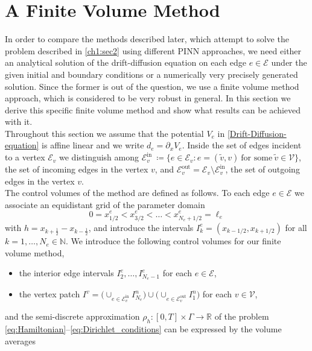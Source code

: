 \chapter{A Finite Volume Method}
\label{ch2}

In order to compare the methods described later, which attempt to solve the problem described in \cref{ch1:sec2} using different PINN approaches, we need either an analytical solution of the drift-diffusion equation on each edge $e \in \mathcal{E}$ under the given initial and boundary conditions or a numerically very precisely generated solution. Since the former is out of the question, we use a finite volume method approach, which is considered to be very robust in general. In this section we derive this specific finite volume method and show what results can be achieved with it.  \\
Throughout this section we assume that the potential $V_e$ in \cref{Drift-Diffusion-equation} is affine linear and we write $d_e = \partial_x V_e$. Inside the set of edges incident to a vertex $\mathcal{E}_v$ we distinguish among $\mathcal{E}_v^{\text{in}} \ \coloneqq \{ e \in \mathcal{E}_v \colon e = ( \widetilde{v}, v ) \ \text{for some} \ \widetilde{v} \in \mathcal{V} \}$, the set of incoming edges in the vertex $v$, and $\mathcal{E}_v^{\text{out}} = \mathcal{E}_v \setminus \mathcal{E}_v^{\text{in}}$, the set of outgoing edges in the vertex $v$. \\
The control volumes of the method are defined as follows. To each edge $e \in \mathcal{E}$ we associate an equidistant grid of the parameter domain
\begin{equation*}
	0 = x^e_{1/2} < x^e_{3/2} <\ldots < x^e_{N_e+1/2} = \ell_e
\end{equation*}
with $h = x_{k+\frac{1}{2}} - x_{k-\frac{1}{2}}$, and introduce the intervals $I_k^e = (x_{k-1/2}, x_{k+1/2})$ for all $k=1, \ldots, N_e \in \mathbb{N}$. We introduce the following control volumes for our finite volume method,
\begin{itemize}
	\item the interior edge intervals $I_2^e, \ldots, I_{N_e-1}^e$ for
	each $e \in \mathcal{E}$,
	\item the vertex patch $I^v = \big(\cup_{e\in \mathcal{E}_v^{\text{in}}} I_{N_e}^n\big) \cup \big(\cup_{e\in \mathcal{E}_v^{\text{out}}} I_1^n\big)$ for
	each $v \in \mathcal{V}$,
\end{itemize}
and the semi-discrete approximation $\rho_h \colon [0,T] \times \Gamma \to \mathbb{R}$ of the problem \eqref{eq:Hamiltonian}--\eqref{eq:Dirichlet_conditions} can be expressed by the volume averages 
